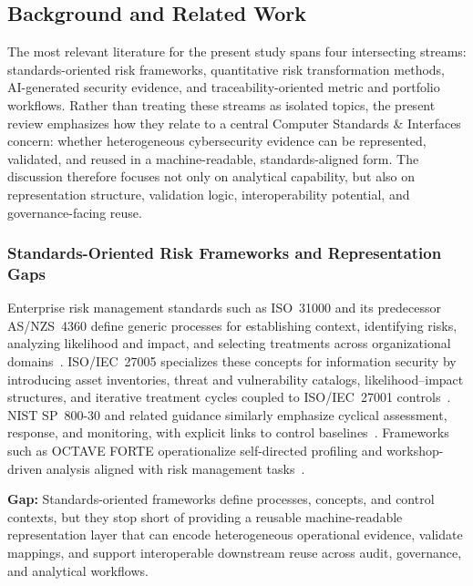 \documentclass[preprint,12pt]{elsarticle}
\begin{document}
\subsection{Background and Related Work}
\label{sec:related}

The most relevant literature for the present study spans four intersecting streams: standards-oriented risk frameworks, quantitative risk transformation methods, AI-generated security evidence, and traceability-oriented metric and portfolio workflows. Rather than treating these streams as isolated topics, the present review emphasizes how they relate to a central Computer Standards \& Interfaces concern: whether heterogeneous cybersecurity evidence can be represented, validated, and reused in a machine-readable, standards-aligned form. The discussion therefore focuses not only on analytical capability, but also on representation structure, validation logic, interoperability potential, and governance-facing reuse.

\subsubsection{Standards-Oriented Risk Frameworks and Representation Gaps}
\label{sec:risk-foundations}

Enterprise risk management standards such as ISO~31000 and its predecessor AS/NZS~4360 define generic processes for establishing context, identifying risks, analyzing likelihood and impact, and selecting treatments across organizational domains~\cite{ISO31000,ASNZS4360}. ISO/IEC~27005 specializes these concepts for information security by introducing asset inventories, threat and vulnerability catalogs, likelihood--impact structures, and iterative treatment cycles coupled to ISO/IEC~27001 controls~\cite{ISO27005}. NIST SP~800-30 and related guidance similarly emphasize cyclical assessment, response, and monitoring, with explicit links to control baselines~\cite{NIST80030}. Frameworks such as OCTAVE FORTE operationalize self-directed profiling and workshop-driven analysis aligned with risk management tasks~\cite{OCTAVEFORTE}.

\noindent\textbf{Gap:} Standards-oriented frameworks define processes, concepts, and control contexts, but they stop short of providing a reusable machine-readable representation layer that can encode heterogeneous operational evidence, validate mappings, and support interoperable downstream reuse across audit, governance, and analytical workflows.
\end{document}
